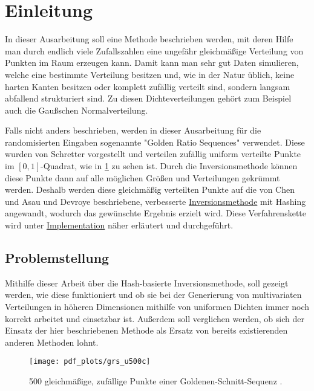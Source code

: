 \section{Einleitung}

In dieser Ausarbeitung soll eine Methode beschrieben werden, mit deren Hilfe man durch endlich viele Zufallszahlen 
eine ungefähr gleichmäßige Verteilung von Punkten im Raum erzeugen kann. Damit kann man sehr gut Daten simulieren, 
welche eine bestimmte Verteilung besitzen und, wie in der Natur üblich, keine harten Kanten besitzen oder komplett 
zufällig verteilt sind, sondern langsam abfallend strukturiert sind. Zu diesen Dichteverteilungen gehört zum Beispiel 
auch die Gaußschen Normalverteilung. 

Falls nicht anders beschrieben, werden in dieser Ausarbeitung für die randomisierten Eingaben sogenannte "Golden Ratio Sequences" 
verwendet. Diese wurden von Schretter \cite{schretter-golden_ratio_sequences-2012} vorgestellt und verteilen zufällig 
uniform verteilte Punkte im $[0, 1]$-Quadrat, wie in \ref{fig:grs500} zu sehen ist. Durch die Inversionsmethode \cite{devroye-non_uniform_random_variate-1986} 
können diese Punkte dann auf alle möglichen Größen und Verteilungen gekrümmt werden. Deshalb werden diese gleichmäßig 
verteilten Punkte auf die von Chen und Asau \cite{chen_asau-generating_random_variates-1974} und Devroye 
\cite{devroye-non_uniform_random_variate-1986} beschriebene, verbesserte \hyperref[funktion]{Inversionsmethode} mit Hashing 
angewandt, wodurch das gewünschte Ergebnis erzielt wird. Diese Verfahrenskette wird unter \hyperref[impl]{Implementation} 
näher erläutert und durchgeführt. 


\subsection{Problemstellung}
Mithilfe dieser Arbeit über die Hash-basierte Inversionsmethode, soll gezeigt werden, wie diese funktioniert und ob  
sie bei der Generierung von multivariaten Verteilungen in höheren Dimensionen mithilfe von uniformen Dichten immer noch 
korrekt arbeitet und einsetzbar ist. Außerdem soll verglichen werden, ob sich der Einsatz der hier beschriebenen 
Methode als Ersatz von bereits existierenden anderen Methoden lohnt. 

\begin{figure}
    \centering
    \texttt{[image: pdf\_plots/grs\_u500c]}
    \caption{500 gleichmäßige, zufällige Punkte einer Goldenen-Schnitt-Sequenz \cite{schretter-golden_ratio_sequences-2012}.}
    \label{fig:grs500}
\end{figure}

